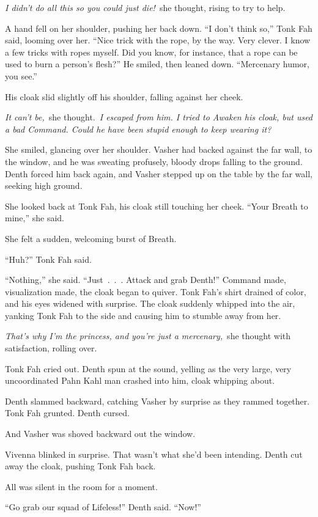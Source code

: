\textit{I didn’t do all this so you could just die!}~she thought, rising to try to help.

A hand fell on her shoulder, pushing her back down. “I don’t think so,” Tonk Fah said, looming over her. “Nice trick with the rope, by the way. Very clever. I know a few tricks with ropes myself. Did you know, for instance, that a rope can be used to burn a person’s flesh?” He smiled, then leaned down. “Mercenary humor, you see.”

His cloak slid slightly off his shoulder, falling against her cheek.

\textit{It can’t be,}~she thought.~\textit{I escaped from him. I tried to Awaken his cloak, but used a bad Command. Could he have been stupid enough to keep wearing it?}

She smiled, glancing over her shoulder. Vasher had backed against the far wall, to the window, and he was sweating profusely, bloody drops falling to the ground. Denth forced him back again, and Vasher stepped up on the table by the far wall, seeking high ground.

She looked back at Tonk Fah, his cloak still touching her cheek. “Your Breath to mine,” she said.

She felt a sudden, welcoming burst of Breath.

“Huh?” Tonk Fah said.

“Nothing,” she said. “Just~.~.~. Attack and grab Denth!” Command made, visualization made, the cloak began to quiver. Tonk Fah’s shirt drained of color, and his eyes widened with surprise. The cloak suddenly whipped into the air, yanking Tonk Fah to the side and causing him to stumble away from her.

\textit{That’s why I’m the princess, and you’re just a mercenary,}~she thought with satisfaction, rolling over.

Tonk Fah cried out. Denth spun at the sound, yelling as the very large, very uncoordinated Pahn Kahl man crashed into him, cloak whipping about.

Denth slammed backward, catching Vasher by surprise as they rammed together. Tonk Fah grunted. Denth cursed.

And Vasher was shoved backward out the window.

Vivenna blinked in surprise. That wasn’t what she’d been intending. Denth cut away the cloak, pushing Tonk Fah back.

All was silent in the room for a moment.

“Go grab our squad of Lifeless!” Denth said. “Now!”

